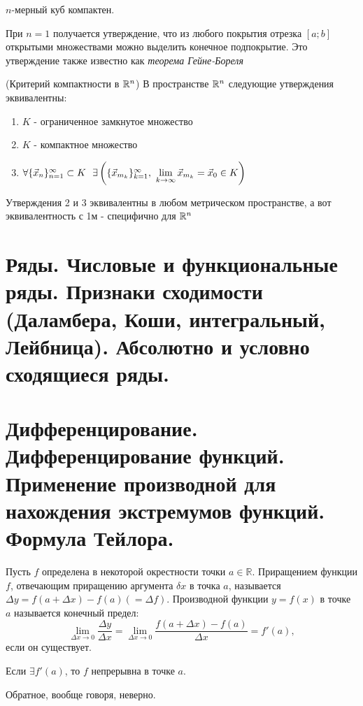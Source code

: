 \begin{multicols}{2}
    \begin{theorema}{}{}
        $n$-мерный куб компактен.
    \end{theorema}
    
    \cons    При $n = 1$ получается утверждение, что из любого покрытия отрезка $[a; b]$ открытыми множествами можно выделить конечное подпокрытие. Это утверждение также известно как \textit{теорема Гейне-Бореля}
    
    \begin{theorema}{(Критерий компактности в $\mathbb{R}^n$)}{}
        В пространстве $\mathbb{R}^n$ следующие утверждения эквивалентны:
        \begin{enumerate}
            \item $K$ - ограниченное замкнутое множество
            
            \item $K$ - компактное множество
            
            \item \(\forall \{\vec{x}_n\}_{n = 1}^\infty \subset K\ \ \exists \left(\{\vec{x}_{m_k}\}_{k = 1}^\infty,\ \lim\limits_{k \to \infty} \vec{x}_{m_k} = \vec{x}_0 \in K \right)\)
        \end{enumerate}
    \end{theorema}
    
    \begin{note}{}{}
        Утверждения 2 и 3 эквивалентны в любом метрическом пространстве, а вот эквивалентность с 1м - специфично для $\mathbb{R}^n$
    \end{note}
    \section{Ряды. Числовые и функциональные ряды. Признаки сходимости (Даламбера, Коши,
    интегральный, Лейбница). Абсолютно и условно сходящиеся ряды.}

    \section{Дифференцирование. Дифференцирование функций. Применение производной для
    нахождения экстремумов функций. Формула Тейлора.}
    \begin{definition}{}{} 
        Пусть $f$ определена в некоторой окрестности точки $a\in \mathbb R$. Приращением функции $f$, отвечающим приращению аргумента $\delta x$ в точка $a$, называется $\Delta y = f(a + \Delta x) - f(a)(=\Delta f)$. Производной функции $y = f(x)$ в точке $a$ называется конечный предел:
        \[
            \lim\limits_{\Delta x\to 0} \dfrac{\Delta y}{\Delta x} = \lim\limits_{\Delta x\to 0} \dfrac{f(a + \Delta x) - f(a)}{\Delta x} = f'(a),
        \]
             если он существует. 
    \end{definition}
    \begin{theorema}{}{}
        Если $\exists f'(a)$, то $f$ непрерывна в точке $a$.
    \end{theorema}
    \begin{note}{}{} 
        Обратное, вообще говоря, неверно.
    \end{note}
    

\end{multicols}
